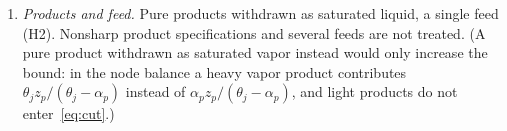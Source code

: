 \documentclass[11pt,a4paper]{report}
\newcommand{\VFTC}{V_{\mathrm{FTC}}}
\begin{document}
\begin{enumerate}
configurations), and it does fail for the pair (161, 3) (Section~\ref{sec:cex}); the other 19 pairs are undecided
(a verifier's multistart search on their all-coupled and all-exchanger variants found no other point below
$\VFTC$). All other configurations are covered (Theorems~\ref{thm:extreme} and~\ref{thm:G3}, the latter under
(N), and the sign rule, the last by the floating-point LP classification of \texttt{signcheck.py}). Numerical searches
find no counterexample. Degenerate points (assumption (N) violated) are
not covered by Theorem~\ref{thm:G3}.
\item \emph{Products and feed.} Pure products withdrawn as saturated liquid, a single feed (H2). Nonsharp product
specifications and several feeds are not treated. (A pure product withdrawn as saturated vapor instead would only
increase the bound: in the node balance a heavy vapor product contributes $\theta_jz_p/(\theta_j-\alpha_p)$ instead of
$\alpha_pz_p/(\theta_j-\alpha_p)$, and light products do not enter~\eqref{eq:cut}.)
\end{enumerate}

\paperreferences
\end{document}
